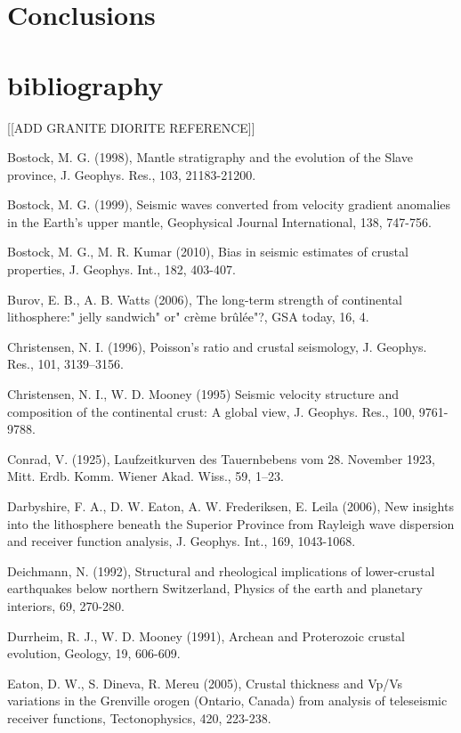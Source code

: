 \documentclass[draft, 12pt]{article}
\begin{document}
\section{Conclusions}



\section{bibliography}

[[ADD GRANITE DIORITE REFERENCE]]

Bostock, M. G. (1998), Mantle stratigraphy and the evolution of the Slave province, J. Geophys. Res., 103, 21183-21200.

Bostock, M. G. (1999), Seismic waves converted from velocity gradient anomalies in the Earth’s upper mantle, Geophysical Journal International, 138, 747-756.

Bostock, M. G., M. R. Kumar (2010), Bias in seismic estimates of crustal properties, J. Geophys. Int., 182, 403-407.

Burov, E. B., A. B. Watts (2006), The long-term strength of continental lithosphere:" jelly sandwich" or" crème brûlée"?, GSA today, 16, 4.

Christensen, N. I. (1996), Poisson's ratio and crustal seismology, J. Geophys. Res., 101, 3139–3156.

Christensen, N. I., W. D. Mooney (1995) Seismic velocity structure and composition of the continental crust: A global view, J. Geophys. Res., 100, 9761-9788.

Conrad, V. (1925), Laufzeitkurven des Tauernbebens vom 28. November 1923, Mitt. Erdb. Komm. Wiener Akad. Wiss., 59, 1–23.

Darbyshire, F. A., D. W. Eaton, A. W. Frederiksen, E. Leila (2006), New insights into the lithosphere beneath the Superior Province from Rayleigh wave dispersion and receiver function analysis, J. Geophys. Int., 169, 1043-1068.

Deichmann, N. (1992), Structural and rheological implications of lower-crustal earthquakes below northern Switzerland, Physics of the earth and planetary interiors, 69, 270-280.

Durrheim, R. J., W. D. Mooney (1991), Archean and Proterozoic crustal evolution, Geology, 19, 606-609.

Eaton, D. W., S. Dineva, R. Mereu (2005), Crustal thickness and Vp/Vs variations in the Grenville orogen (Ontario, Canada) from analysis of teleseismic receiver functions, Tectonophysics, 420, 223-238.
\end{document}
